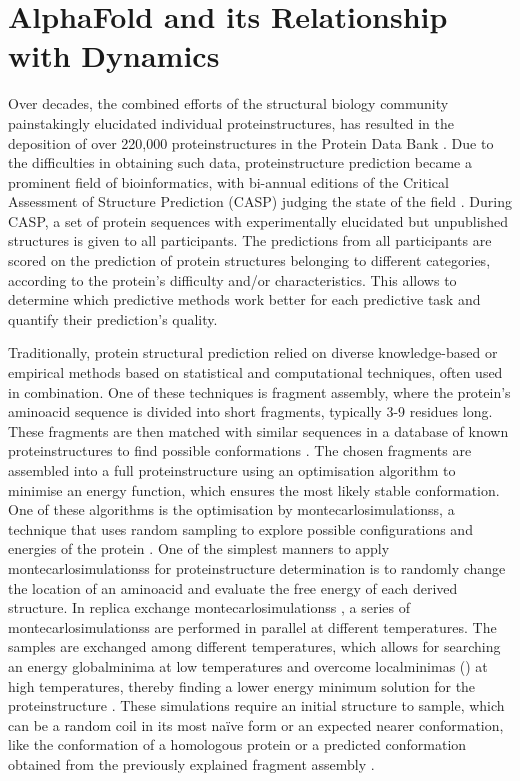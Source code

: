 \section{AlphaFold and its Relationship with Dynamics}

Over decades, the combined efforts of the structural biology community painstakingly elucidated individual \glspl{proteinstructure}, has resulted in the deposition of over 220,000 \glspl{proteinstructure} in the Protein Data Bank \cite{noauthor_pdb_nodate}. Due to the difficulties in obtaining such data, \gls{proteinstructure} prediction became a prominent field of bioinformatics, with bi-annual editions of the Critical Assessment of Structure Prediction (CASP) judging the state of the field \cite{moult_large-scale_1995}. During CASP, a set of protein sequences with experimentally elucidated but unpublished structures is given to all participants. The predictions from all participants are scored on the prediction of 
protein structures belonging to different categories, according to the protein's difficulty and/or characteristics. This allows to determine which predictive methods work better for each predictive task and quantify their prediction's quality.

Traditionally, protein structural prediction relied on diverse knowledge-based or empirical methods based on statistical and computational techniques, often used in combination. One of these techniques is fragment assembly, where the protein's \gls{aminoacid} sequence is divided into short fragments, typically 3-9 residues long. These fragments are then matched with similar sequences in a database of known \glspl{proteinstructure} to find possible \glspl{conformation} \cite{rohl_protein_2004}. The chosen fragments are assembled into a full \gls{proteinstructure} using an optimisation algorithm to minimise an energy function, which ensures the most likely stable \gls{conformation}. One of these algorithms is the optimisation by \glspl{montecarlosimulations}, a technique that uses random sampling to explore possible configurations and energies of the protein \cite{rohl_protein_2004}. One of the simplest manners to apply \glspl{montecarlosimulations} for \gls{proteinstructure} determination is to randomly change the location of an \gls{aminoacid} and evaluate the free energy of each derived structure. In replica exchange \glspl{montecarlosimulations} \cite{xu_ab_2012}, a series of \glspl{montecarlosimulations} are performed in parallel at different temperatures. The samples are exchanged among different temperatures, which allows for searching an energy \gls{globalminima} at low temperatures and overcome \glspl{localminima} () at high temperatures, thereby finding a lower energy minimum solution for the \gls{proteinstructure} \cite{xu_ab_2012}. These simulations require an initial structure to sample, which can be a random coil in its most naïve form or an expected nearer \gls{conformation}, like the \gls{conformation} of a homologous protein or a predicted \gls{conformation} obtained from the previously explained fragment assembly \cite{yang_i-tasser_2015}.


